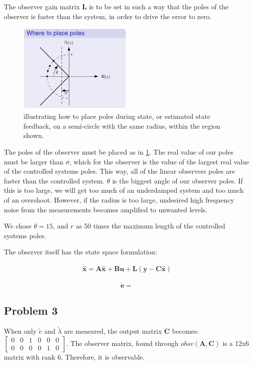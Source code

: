 The observer gain matrix $\bm{L}$ is to be set in such a way that the poles of the observer is faster than the system, in order to drive the error to zero.
	\begin{figure}[H]
		\caption{ illustrating how to place poles during state, or estimated state feedback, on a semi-circle with the same radius, within the region shown.}
		\label{fig:pole_placement}
		\begin{center}
		\includegraphics[width=0.5\textwidth]{images/pole_placement}
		\end{center}
	\end{figure}
The poles of the observer must be placed as in \cref{fig:pole_placement}. The real value of our poles must be larger than $\sigma$, which for the observer is the value of the largest real value of the controlled systems poles. This way, all of the linear observers poles are faster than the controlled system. $\theta$ is the biggest angle of our observer poles. If this is too large, we will get too much of an underdamped system and too much of an overshoot. However, if the radius is too large, undesired high frequency noise from the measurements becomes amplified to unwanted levels.

We chose $\theta = 15$, and $r$ as 50 times the maximum length of the controlled systems poles.

The observer itself has the state space formulation:

\begin{equation*}
	\dot{\hat{\bm{x}}} = \bm{A}\hat{\bm{x}}+\bm{B}\bm{u} + \bm{L}(\bm{y} - \bm{C}\hat{\bm{x}})
\end{equation*}

\begin{align*}
	\bm{\dot{e}} =
\end{align*}
\subsection{Problem 3}
When only $\tilde{e}$ and $\tilde{\lambda}$ are measured, the output matrix $\bm{C}$ becomes:
	$\begin{bmatrix}
    0 & 0 & 1 & 0 & 0 & 0 \\
    0 & 0 & 0 & 0 & 1 & 0
	\end{bmatrix}$.
The observer matrix, found through $obsv(\bm{A},\bm{C})$ is a 12x6 matrix with rank 6. Therefore, it is observable.

